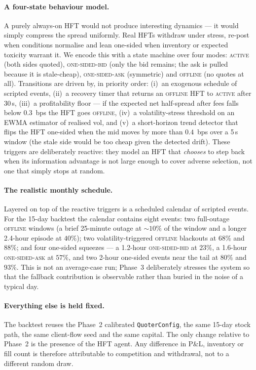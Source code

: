 \paragraph{A four-state behaviour model.} A purely always-on HFT
would not produce interesting dynamics --- it would simply compress
the spread uniformly. Real HFTs withdraw under stress, re-post
when conditions normalise and lean one-sided when inventory or
expected toxicity warrant it. We encode this with a state machine
over four modes: \textsc{active} (both sides quoted),
\textsc{one-sided-bid} (only the bid remains; the ask is pulled
because it is stale-cheap), \textsc{one-sided-ask} (symmetric) and
\textsc{offline} (no quotes at all). Transitions are driven by, in
priority order: (i)~an exogenous schedule of scripted events,
(ii)~a recovery timer that returns an \textsc{offline} HFT to
\textsc{active} after 30\,s, (iii)~a profitability floor --- if the
expected net half-spread after fees falls below $0.3$~bps the HFT
goes \textsc{offline}, (iv)~a volatility-stress threshold on an EWMA
estimator of realised vol, and (v)~a short-horizon trend detector
that flips the HFT one-sided when the mid moves by more than
$0.4$~bps over a 5\,s window (the stale side would be too cheap
given the detected drift). These triggers are deliberately
reactive: they model an HFT that \emph{chooses} to step back when
its information advantage is not large enough to cover adverse
selection, not one that simply stops at random.

\paragraph{The realistic monthly schedule.} Layered on top of the
reactive triggers is a scheduled calendar of scripted events. For
the 15-day backtest the calendar contains eight events:
two full-outage \textsc{offline} windows (a brief 25-minute outage
at $\sim\!10\%$ of the window and a longer 2.4-hour episode at
$40\%$); two volatility-triggered \textsc{offline} blackouts at
$68\%$ and $88\%$; and four one-sided squeezes --- a 1.2-hour
\textsc{one-sided-bid} at $23\%$, a 1.6-hour \textsc{one-sided-ask}
at $57\%$, and two 2-hour one-sided events near the tail at $80\%$
and $93\%$. This is not an average-case run; Phase~3 deliberately
stresses the system so that the fallback contribution is
observable rather than buried in the noise of a typical day.

\paragraph{Everything else is held fixed.} The backtest reuses the
Phase~2 calibrated \texttt{QuoterConfig}, the same 15-day stock
path, the same client-flow seed and the same capital. The only
change relative to Phase~2 is the presence of the HFT agent. Any
difference in P\&L, inventory or fill count is therefore
attributable to competition and withdrawal, not to a different
random draw.

